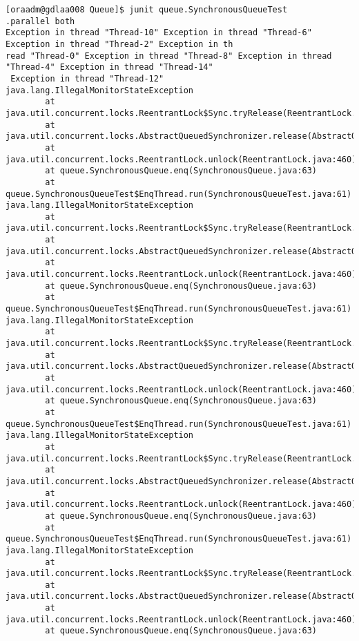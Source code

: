 \begin{verbatim}
[oraadm@gdlaa008 Queue]$ junit queue.SynchronousQueueTest
.parallel both
Exception in thread "Thread-10" Exception in thread "Thread-6" Exception in thread "Thread-2" Exception in th
read "Thread-0" Exception in thread "Thread-8" Exception in thread "Thread-4" Exception in thread "Thread-14"
 Exception in thread "Thread-12" java.lang.IllegalMonitorStateException
        at java.util.concurrent.locks.ReentrantLock$Sync.tryRelease(ReentrantLock.java:155)
        at java.util.concurrent.locks.AbstractQueuedSynchronizer.release(AbstractQueuedSynchronizer.java:1260)
        at java.util.concurrent.locks.ReentrantLock.unlock(ReentrantLock.java:460)
        at queue.SynchronousQueue.enq(SynchronousQueue.java:63)
        at queue.SynchronousQueueTest$EnqThread.run(SynchronousQueueTest.java:61)
java.lang.IllegalMonitorStateException
        at java.util.concurrent.locks.ReentrantLock$Sync.tryRelease(ReentrantLock.java:155)
        at java.util.concurrent.locks.AbstractQueuedSynchronizer.release(AbstractQueuedSynchronizer.java:1260)
        at java.util.concurrent.locks.ReentrantLock.unlock(ReentrantLock.java:460)
        at queue.SynchronousQueue.enq(SynchronousQueue.java:63)
        at queue.SynchronousQueueTest$EnqThread.run(SynchronousQueueTest.java:61)
java.lang.IllegalMonitorStateException
        at java.util.concurrent.locks.ReentrantLock$Sync.tryRelease(ReentrantLock.java:155)
        at java.util.concurrent.locks.AbstractQueuedSynchronizer.release(AbstractQueuedSynchronizer.java:1260)
        at java.util.concurrent.locks.ReentrantLock.unlock(ReentrantLock.java:460)
        at queue.SynchronousQueue.enq(SynchronousQueue.java:63)
        at queue.SynchronousQueueTest$EnqThread.run(SynchronousQueueTest.java:61)
java.lang.IllegalMonitorStateException
        at java.util.concurrent.locks.ReentrantLock$Sync.tryRelease(ReentrantLock.java:155)
        at java.util.concurrent.locks.AbstractQueuedSynchronizer.release(AbstractQueuedSynchronizer.java:1260)
        at java.util.concurrent.locks.ReentrantLock.unlock(ReentrantLock.java:460)
        at queue.SynchronousQueue.enq(SynchronousQueue.java:63)
        at queue.SynchronousQueueTest$EnqThread.run(SynchronousQueueTest.java:61)
java.lang.IllegalMonitorStateException
        at java.util.concurrent.locks.ReentrantLock$Sync.tryRelease(ReentrantLock.java:155)
        at java.util.concurrent.locks.AbstractQueuedSynchronizer.release(AbstractQueuedSynchronizer.java:1260)
        at java.util.concurrent.locks.ReentrantLock.unlock(ReentrantLock.java:460)
        at queue.SynchronousQueue.enq(SynchronousQueue.java:63)

\end{verbatim}
